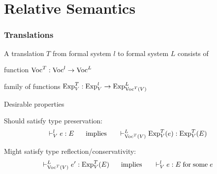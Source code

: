 %

\section{Relative Semantics}

\begin{frame}\frametitle{Translations}
\begin{blockitems}{A translation $T$ from formal system $l$ to formal system $L$ consists of}
\item function $\mathrm{Voc}^T:\mathrm{Voc}^l\to\mathrm{Voc}^L$
\item family of functions $\mathrm{Exp}^T_V:\mathrm{Exp}^l_V\to\mathrm{Exp}^L_{\mathrm{Voc}^T(V)}$
\end{blockitems}

\begin{blockitems}{Desirable properties}
\item Should satisfy type preservation:
\[\vdash^l_V e:E \hspace*{.5cm}\;\mathrm{implies}\;\hspace*{.5cm} \vdash^L_{\mathrm{Voc}^T(V)} \mathrm{Exp}^T_V(e):\mathrm{Exp}^T_V(E)\]
\item Might satisfy type reflection/conservativity: 
\[\vdash^L_{\mathrm{Voc}^T(V)} e':\mathrm{Exp}^T_V(E) \hspace*{.5cm}\;\mathrm{implies}\;\hspace*{.5cm} \vdash^l_V e:E \;\mathrm{for}\;\mathrm{some}\; e\]
\end{blockitems}
\end{frame}

